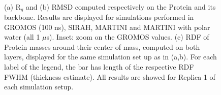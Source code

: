 \begin{figure}[p!]
\centering
{} 
 \\
\caption[Structural measures on buckyball in solution]{(a) R$_g$ and (b) RMSD computed respectively on the Protein and its backbone. Results are displayed for simulations performed in GROMOS (100 ns), SIRAH, MARTINI and MARTINI with polar water (all 1 $\mu$s). Inset: zoom on the GROMOS values. (c) RDF of Protein masses around their center of mass, computed on both layers, displayed for the same simulation set up as in (a,b). For each label of the legend, the bar has length of the respective RDF FWHM (thickness estimate). All results are showed for Replica 1 of each simulation setup.}
\label{fig:struct_UA_SIhere}
\end{figure}
%
